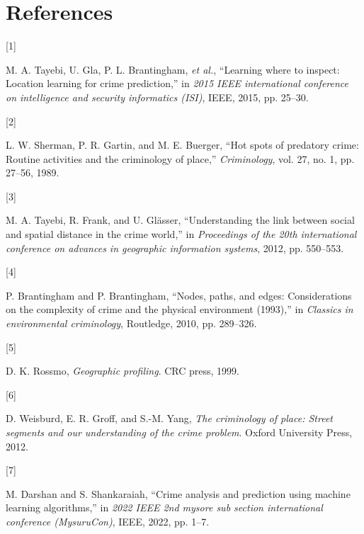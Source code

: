\documentclass[11 pt,conference,final,]{IEEEtran}
\newlength{\cslhangindent}
\newlength{\csllabelwidth}
\newenvironment{CSLReferences}[2] %
 {\begin{list}{}{%
  \setlength{\itemindent}{0pt}
  \setlength{\leftmargin}{0pt}
  \setlength{\parsep}{0pt}
  \ifodd #1
   \setlength{\leftmargin}{\cslhangindent}
   \setlength{\itemindent}{-1\cslhangindent}
  \fi
  \setlength{\itemsep}{#2\baselineskip}}}
 {\end{list}}
\newcommand{\CSLLeftMargin}[1]{\parbox[t]{\csllabelwidth}{#1}}
\newcommand{\CSLRightInline}[1]{\parbox[t]{\linewidth - \csllabelwidth}{#1}\break}
\begin{document}
\section*{References}\label{references}

\label{refs}
\begin{CSLReferences}{0}{0}
\CSLLeftMargin{{[}1{]} }%
\CSLRightInline{M. A. Tayebi, U. Gla, P. L. Brantingham, \emph{et al.},
{``Learning where to inspect: Location learning for crime prediction,''}
in \emph{2015 IEEE international conference on intelligence and security
informatics (ISI)}, IEEE, 2015, pp. 25--30.}

\CSLLeftMargin{{[}2{]} }%
\CSLRightInline{L. W. Sherman, P. R. Gartin, and M. E. Buerger, {``Hot
spots of predatory crime: Routine activities and the criminology of
place,''} \emph{Criminology}, vol. 27, no. 1, pp. 27--56, 1989.}

\CSLLeftMargin{{[}3{]} }%
\CSLRightInline{M. A. Tayebi, R. Frank, and U. Glässer, {``Understanding
the link between social and spatial distance in the crime world,''} in
\emph{Proceedings of the 20th international conference on advances in
geographic information systems}, 2012, pp. 550--553.}

\CSLLeftMargin{{[}4{]} }%
\CSLRightInline{P. Brantingham and P. Brantingham, {``Nodes, paths, and
edges: Considerations on the complexity of crime and the physical
environment (1993),''} in \emph{Classics in environmental criminology},
Routledge, 2010, pp. 289--326.}

\CSLLeftMargin{{[}5{]} }%
\CSLRightInline{D. K. Rossmo, \emph{Geographic profiling}. CRC press,
1999.}

\CSLLeftMargin{{[}6{]} }%
\CSLRightInline{D. Weisburd, E. R. Groff, and S.-M. Yang, \emph{The
criminology of place: Street segments and our understanding of the crime
problem}. Oxford University Press, 2012.}

\CSLLeftMargin{{[}7{]} }%
\CSLRightInline{M. Darshan and S. Shankaraiah, {``Crime analysis and
prediction using machine learning algorithms,''} in \emph{2022 IEEE 2nd
mysore sub section international conference (MysuruCon)}, IEEE, 2022,
pp. 1--7.}


\end{CSLReferences}
\end{document}
